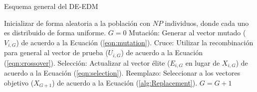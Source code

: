 \begin{algorithm}[t]
  \scriptsize
	\caption{Esquema general del DE-EDM} 
	\begin{algorithmic}[1]
	\STATE Inicializar de forma aleatoria a la población con $NP$ individuos, donde cada uno es distribuido de forma uniforme.
	\STATE $G=0$
		\STATE Mutación: Generar al vector mutado ($V_{i,G}$) de acuerdo a la Ecuación (\ref{eqn:mutation}).
		\STATE Cruce: Utilizar la recombinación para general al vector de prueba ($U_{i,G}$) de acuerdo a la Ecuación (\ref{eqn:crossover}).
		\STATE Selección: Actualizar al vector élite ($E_{i,G}$ en lugar de $X_{i,G}$) de acuerdo a la Ecuación (\ref{eqn:selection}).
	   \ENDFOR
		\STATE Reemplazo: Seleccionar a los vectores objetivo ($X_{G+1}$) de acuerdo a la Ecuación (\ref{alg:Replacement}).
	   \STATE $G=G+1$
	\ENDWHILE
\end{algorithmic}
    \label{alg:DEEDM}
\end{algorithm}


